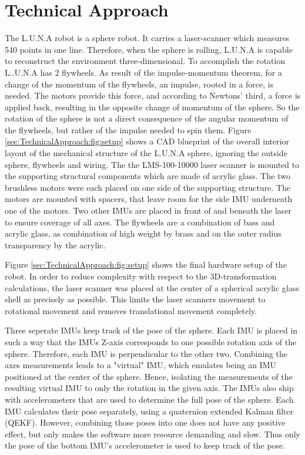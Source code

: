 \section{Technical Approach}
\label{sec:TechnicalApproach}

The L.U.N.A robot is a sphere robot. It carries a  laser-scanner which measures 540 points in one line. Therefore, when the sphere is rolling, L.U.N.A is capable to reconstruct the environment three-dimensional. To accomplish the rotation L..U.N.A has 2 flywheels.
As result of the impulse-momentum theorem, for a change of the momentum of the flywheels, an impulse, rooted in a force, is needed. 
The motors provide this force, and according to Newtons' third, a force is applied back, resulting in the opposite change of momentum of the sphere. 
So the rotation of the sphere is not a direct consequence of the angular momentum of the flywheels, but rather of the impulse needed to spin them. 
Figure \ref{sec:TechnicalApproach:fig:setup} shows a CAD blueprint of the overall interior layout of the mechanical structure of the L.U.N.A sphere, ignoring the outside sphere, flywheels and wiring.
The the LMS-100-10000 laser scanner is mounted to the supporting structural components which are made of acrylic glass.
The two brushless motors were each placed on one side of the supporting structure. 
The motors are mounted with spacers, that leave room for the side IMU underneath one of the motors. 
Two other IMUs are placed in front of and beneath the laser to ensure coverage of all axes. 
The flywheels are a combination of bass and acrylic glass, as combination of high weight by brass and on the outer radius transparency by the acrylic.

Figure \ref{sec:TechnicalApproach:fig:setup} shows the final hardware setup of the robot.
In order to reduce complexity with respect to the 3D-transformation calculations, the laser scanner was placed at the center of a spherical acrylic glass shell as precisely as possible.
This limits the laser scanners movement to rotational movement and removes translational movement completely. 
                                   

Three seperate IMUs keep track of the pose of the sphere. Each IMU is placed in such a way that the IMUs Z-axis corresponds to one possible rotation axis of the sphere.
Therefore, each IMU is perpendicular to the other two.
Combining the axes measurements leads to a "virtual" IMU, which emulates being an IMU positioned at the center of the sphere. 
Hence, isolating the measurements of the resulting virtual IMU to only the rotation in the given axis.
The IMUs also ship with accelerometers that are used to determine the full pose of the sphere.
Each IMU calculates their pose separately, using a quaternion extended Kalman filter (QEKF).
However, combining those poses into one does not have any positive effect, but only makes the software more resource demanding and slow.
Thus only the pose of the bottom IMU's accelerometer is used to keep track of the pose.

